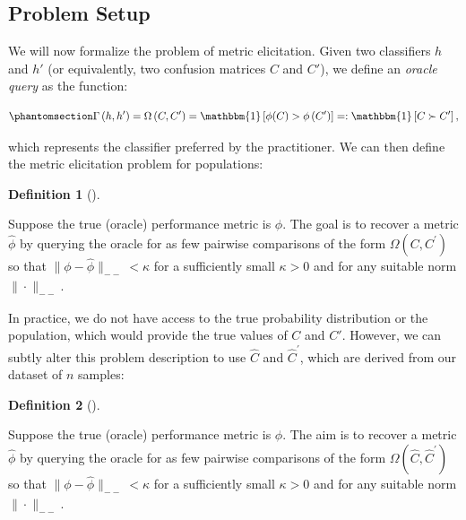 \documentclass[
  letterpaper,
  numbers=noenddot,
  DIV=11]{scrreprt}
\theoremstyle{definition}
\newtheorem{definition}{Definition}[chapter]
\theoremstyle{plain}
\theoremstyle{plain}
\theoremstyle{remark}
\begin{document}
\subsection{Problem Setup}\label{sec-metric-elicitation-setup}

We will now formalize the problem of metric elicitation. Given two
classifiers \(h\) and \(h'\) (or equivalently, two confusion matrices
\(C\) and \(C'\)), we define an \emph{oracle query} as the function:

\begin{equation}\phantomsection\label{eq-oracle}{\Gamma\left(h, h^{\prime}\right)=\Omega\left(C, C^{\prime}\right)=\mathbbm{1}\left[\phi(C)>\phi\left(C^{\prime}\right)\right]=: \mathbbm{1} \left[C \succ C^{\prime}\right],}\end{equation}

which represents the classifier preferred by the practitioner. We can
then define the metric elicitation problem for populations:

\begin{tcolorbox}[colframe=.grey, title=\faPenSquare \enspace Definition]

\begin{definition}[]\protect\hypertarget{def-def3.1}{}\label{def-def3.1}

Suppose the true (oracle) performance metric is \(\phi\). The goal is to
recover a metric \(\hat{\phi}\) by querying the oracle for as few
pairwise comparisons of the form \(\Omega\left(C, C^{\prime}\right)\) so
that \(\|\phi - \hat{\phi}\|_{--} < \kappa\) for a sufficiently small
\(\kappa > 0\) and for any suitable norm \(\|\cdot\|_{--}\).

\end{definition}

\end{tcolorbox}

In practice, we do not have access to the true probability distribution
or the population, which would provide the true values of \(C\) and
\(C'\). However, we can subtly alter this problem description to use
\(\hat{C}\) and \(\hat{C}^{\prime}\), which are derived from our dataset
of \(n\) samples:

\begin{tcolorbox}[colframe=.grey, title=\faPenSquare \enspace Definition]

\begin{definition}[]\protect\hypertarget{def-def3.2}{}\label{def-def3.2}

Suppose the true (oracle) performance metric is \(\phi\). The aim is to
recover a metric \(\hat{\phi}\) by querying the oracle for as few
pairwise comparisons of the form
\(\Omega\left(\hat{C}, \hat{C}^{\prime}\right)\) so that
\(\|\phi - \hat{\phi}\|_{--} < \kappa\) for a sufficiently small
\(\kappa > 0\) and for any suitable norm \(\|\cdot\|_{--}\).

\end{definition}

\end{tcolorbox}
\end{document}
